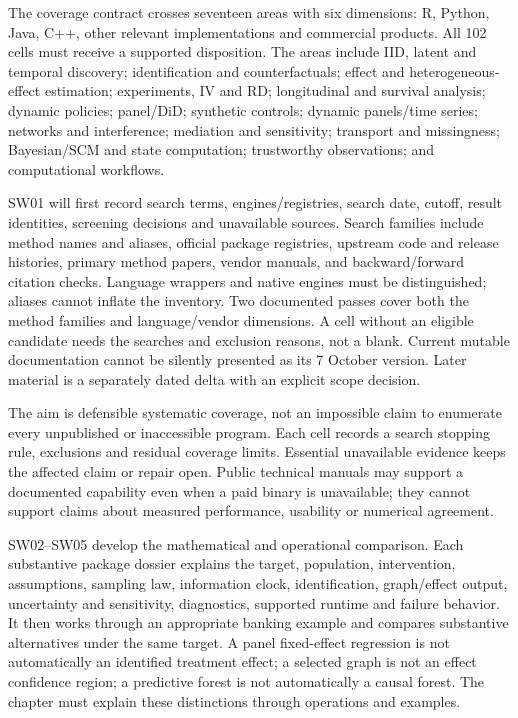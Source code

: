 \documentclass[
  11pt,
  a4paper,
]{article}
\begin{document}
The coverage contract crosses seventeen areas with six dimensions: R,
Python, Java, C++, other relevant implementations and commercial
products. All 102 cells must receive a supported disposition. The areas
include IID, latent and temporal discovery; identification and
counterfactuals; effect and heterogeneous-effect estimation;
experiments, IV and RD; longitudinal and survival analysis; dynamic
policies; panel/DiD; synthetic controls; dynamic panels/time series;
networks and interference; mediation and sensitivity; transport and
missingness; Bayesian/SCM and state computation; trustworthy
observations; and computational workflows.

SW01 will first record search terms, engines/registries, search date,
cutoff, result identities, screening decisions and unavailable sources.
Search families include method names and aliases, official package
registries, upstream code and release histories, primary method papers,
vendor manuals, and backward/forward citation checks. Language wrappers
and native engines must be distinguished; aliases cannot inflate the
inventory. Two documented passes cover both the method families and
language/vendor dimensions. A cell without an eligible candidate needs
the searches and exclusion reasons, not a blank. Current mutable
documentation cannot be silently presented as its 7 October version.
Later material is a separately dated delta with an explicit scope
decision.

The aim is defensible systematic coverage, not an impossible claim to
enumerate every unpublished or inaccessible program. Each cell records a
search stopping rule, exclusions and residual coverage limits. Essential
unavailable evidence keeps the affected claim or repair open. Public
technical manuals may support a documented capability even when a paid
binary is unavailable; they cannot support claims about measured
performance, usability or numerical agreement.

SW02--SW05 develop the mathematical and operational comparison. Each
substantive package dossier explains the target, population,
intervention, assumptions, sampling law, information clock,
identification, graph/effect output, uncertainty and sensitivity,
diagnostics, supported runtime and failure behavior. It then works
through an appropriate banking example and compares substantive
alternatives under the same target. A panel fixed-effect regression is
not automatically an identified treatment effect; a selected graph is
not an effect confidence region; a predictive forest is not
automatically a causal forest. The chapter must explain these
distinctions through operations and examples.
\end{document}
